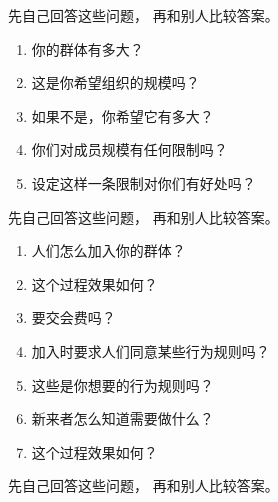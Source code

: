 先自己回答这些问题，
再和别人比较答案。

\begin{enumerate}

\item
  你的群体有多大？

\item
  这是你希望组织的规模吗？

\item
  如果不是，你希望它有多大？

\item
  你们对成员规模有任何限制吗？

\item
  设定这样一条限制对你们有好处吗？

\end{enumerate}


先自己回答这些问题，
再和别人比较答案。

\begin{enumerate}

\item
  人们怎么加入你的群体？

\item
  这个过程效果如何？

\item
  要交会费吗？

\item
  加入时要求人们同意某些行为规则吗？

\item
  这些是你想要的行为规则吗？

\item
  新来者怎么知道需要做什么？

\item
  这个过程效果如何？
  
\end{enumerate}


先自己回答这些问题，
再和别人比较答案。

